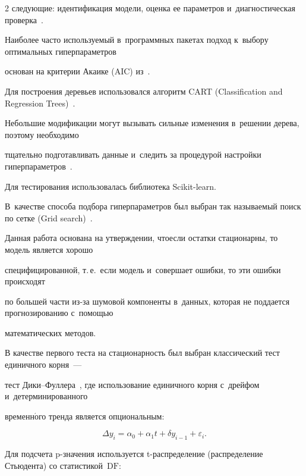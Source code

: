 \begin{multicols}{2}
 сле\-ду\-ющие: идентификация модели, оценка ее параметров и~диагностическая проверка~\cite{16-kr}. 

 Наиболее часто используемый в~про\-грам\-мных пакетах подход к~выбору оптимальных гиперпараметров 

 основан на критерии Акаике (AIC) из~\cite{17-kr}.



Для построения деревьев использовался алгоритм CART (Classification and Regression Trees)~\cite{18-kr}. 

Небольшие модификации могут вызывать сильные изменения в~решении дерева, поэтому необходимо 

тщательно подготавливать данные и~следить за процедурой настройки гиперпараметров~\cite{19-kr}. 

Для тестирования использовалась библиотека Scikit-learn. 

В~качестве способа подбора гиперпараметров был выбран так называемый поиск по сетке (Grid search)~\cite{18-kr}.



Данная работа основана на утверждении, что\linebreak если остатки стационарны, то модель является хорошо 

специфицированной, т.\,е.\ если модель и~совершает ошибки, то эти ошибки происходят 

по большей части из-за шумовой компоненты в~данных, которая не поддается прогнозированию с~по\-мощью 

математических методов.



В качестве первого теста на стационарность был выбран классический тест единичного корня~--- 

тест Ди\-ки--Фул\-ле\-ра~\cite{21-kr}, где использование единичного корня с~дрейфом и~детерминированного 

временн$\acute{\mbox{о}}$го тренда является опциональным:

\begin{equation*}

\Delta y_i = \alpha_0 + \alpha_1  t+\delta y_{i-1}+\varepsilon_i.

\end{equation*}





Для подсчета p-значения используется t-рас\-пре\-де\-ле\-ние (распределение Стьюдента) со ста\-ти\-сти\-кой~$\mathrm{DF}$:


\end{multicols}
